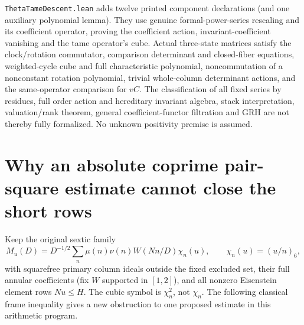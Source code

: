 \documentclass[11pt]{article}
\theoremstyle{definition}\newtheorem{definition}[theorem]{Definition}
\theoremstyle{remark}\newtheorem{remark}[theorem]{Remark}
\begin{document}
\texttt{ThetaTameDescent.lean} adds twelve printed component declarations (and one auxiliary polynomial lemma). They use genuine formal-power-series rescaling and its coefficient operator, proving the coefficient action, invariant-coefficient vanishing and the tame operator's cube. Actual three-state matrices satisfy the clock/rotation commutator, comparison determinant and closed-fiber equations, weighted-cycle cube and full characteristic polynomial, noncommutation of a nonconstant rotation polynomial, trivial whole-column determinant actions, and the same-operator comparison for $vC$. The classification of all fixed series by residues, full order action and hereditary invariant algebra, stack interpretation, valuation/rank theorem, general coefficient-functor filtration and GRH are not thereby fully formalized. No unknown positivity premise is assumed.

\section{Why an absolute coprime pair-square estimate cannot close the short rows}
\label{sec:pair-barrier}
Keep the original sextic family
\[
 M_u(D)=D^{-1/2}\sum_n\mu(n)\nu(n)W(Nn/D)\chi_n(u),
 \qquad \chi_n(u)=(u/n)_6,
\]
with squarefree primary column ideals outside the fixed excluded set,
their full annular coefficients (fix $W$ supported in $[1,2]$), and all
nonzero Eisenstein element rows
$Nu\le H$. The cubic symbol is $\chi_n^2$, not $\chi_n$.
The following classical frame inequality \cite{WelchGeometry} gives a new
obstruction to one proposed estimate in this arithmetic program.
\end{document}

